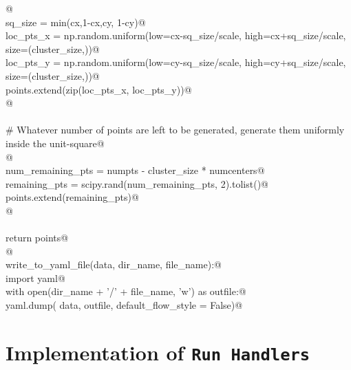 \documentclass[10pt, english, oneside]{report}
\begin{document}
\begin{appendices}
\begin{flushleft}
\begin{list}{}{}
\mbox{}\verb@           @\\
\mbox{}\verb@        sq_size      = min(cx,1-cx,cy, 1-cy)@\\
\mbox{}\verb@        loc_pts_x    = np.random.uniform(low=cx-sq_size/scale, high=cx+sq_size/scale, size=(cluster_size,))@\\
\mbox{}\verb@        loc_pts_y    = np.random.uniform(low=cy-sq_size/scale, high=cy+sq_size/scale, size=(cluster_size,))@\\
\mbox{}\verb@        points.extend(zip(loc_pts_x, loc_pts_y))@\\
\mbox{}\verb@        @\\
\mbox{}\verb@@\\
\mbox{}\verb@    # Whatever number of points are left to be generated, generate them uniformly inside the unit-square@\\
\mbox{}\verb@       @\\
\mbox{}\verb@    num_remaining_pts = numpts - cluster_size * numcenters@\\
\mbox{}\verb@    remaining_pts = scipy.rand(num_remaining_pts, 2).tolist()@\\
\mbox{}\verb@    points.extend(remaining_pts)@\\
\mbox{}\verb@    @\\
\mbox{}\verb@@\\
\mbox{}\verb@    return points@\\
\mbox{}\verb@    @\\
\mbox{}\verb@def write_to_yaml_file(data, dir_name, file_name):@\\
\mbox{}\verb@   import yaml@\\
\mbox{}\verb@   with open(dir_name + '/' + file_name, 'w') as outfile:@\\
\mbox{}\verb@     yaml.dump( data, outfile, default_flow_style = False)@\\
\mbox{}\verb@@{\NWsep}
\end{list}
\vspace{-1.5ex}
\footnotesize
\begin{list}{}{\setlength{\itemsep}{-\parsep}\setlength{\itemindent}{-\leftmargin}}

\item{}
\end{list}
\vspace{4ex}
\end{flushleft}

\chapter{Implementation of \textlangle \texttt{Run Handlers}\textrangle}


\end{appendices}
\end{document}
